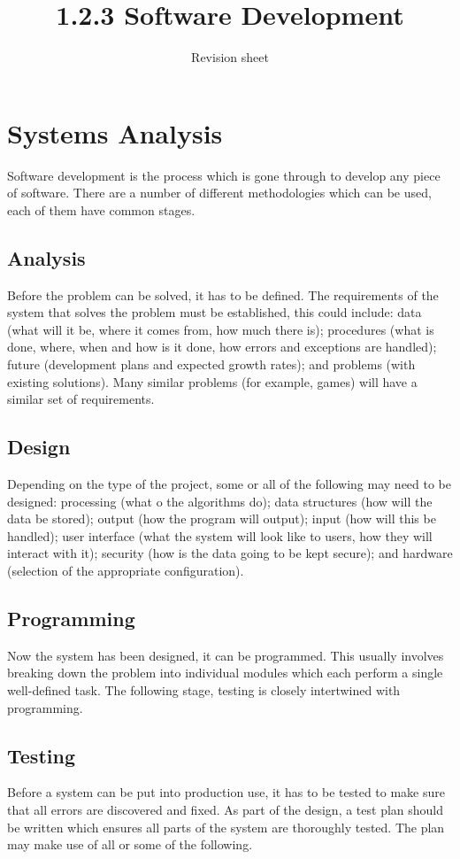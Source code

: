 \documentclass[a4paper,11pt, twocolumn]{article}
\title{1.2.3 Software Development}
\author{Revision sheet}
\date{}
\begin{document}
\maketitle
\thispagestyle{fancy}


\section{Systems Analysis}
Software development is the process which is gone through to develop any piece of software. There are a number of different methodologies which can be used, each of them have common stages.
\subsection{Analysis}
Before the problem can be solved, it has to be defined. The requirements of the system that solves the problem must be established, this could include: data (what will it be, where it comes from, how much there is); procedures (what is done, where, when and how is it done, how errors and exceptions are handled); future (development plans and expected growth rates); and problems (with existing solutions). Many similar problems (for example, games) will have a similar set of requirements.
\subsection{Design}
Depending on the type of the project, some or all of the following may need to be designed: processing (what o the algorithms do); data structures (how will the data be stored); output (how the program will output); input (how will this be handled); user interface (what the system will look like to users, how they will interact with it); security (how is the data going to be kept secure); and hardware (selection of the appropriate configuration).
\subsection{Programming}
Now the system has been designed, it can be programmed. This usually involves breaking down the problem into individual modules which each perform a single well-defined task. The following stage, testing is closely intertwined with programming.
\subsection{Testing}
Before a system can be put into production use, it has to be tested to make sure that all errors are discovered and fixed. As part of the design, a test plan should be written which ensures all parts of the system are thoroughly tested. The plan may make use of all or some of the following.
\end{document}
